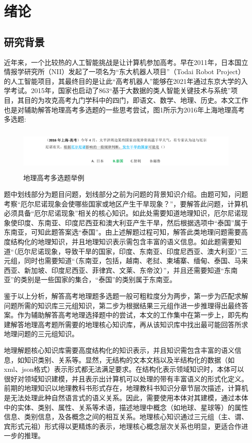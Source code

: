 \chapter{绪论}
\section{研究背景}
近年来，一个比较热的人工智能挑战是让计算机参加高考。早在2011年，日本国立情报学研究所（NII）发起了一项名为“东大机器人项目”（Todai Robot Project）的人工智能项目，其最终目的是让此“高考机器人”能够在2021年通过东京大学的入学考试\cite{Fujita}。2015年，国家也启动了863“基于大数据的类人智能关键技术与系统”项目，其目的为攻克高考九门学科中的四门，即语文、数学、地理、历史\cite{Cheng}。本文工作也是对辅助解答地理高考多选题的一些思考尝试，图1所示为2016年上海地理高考多选题:

\begin{figure}[!htb]
	\centering\includegraphics[height=2.2cm]{resource/ex_multi_choice_ques}
	\caption{地理高考多选题举例}
	\label{fig:ex_multi_choice_ques}
\end{figure}

题中划线部分为题目问题，划线部分之前为问题的背景知识介绍。由题可知，问题考察“厄尔尼诺现象会使哪些国家或地区产生干旱现象？”，要解答此问题，计算机必须具备“厄尔尼诺现象”相关的核心知识。如此处需要知道地理知识，厄尔尼诺现象使印度、东南亚、印度尼西亚和澳大利亚产生干旱，然后根据选项中“泰国”属于东南亚，可知此题答案选“泰国”。由上述解题过程可知，解答此类地理问题需要高度结构化的地理知识，并且地理知识表示需包含丰富的语义信息。如此题需要知道“（厄尔尼诺现象，导致干旱的国家，印度、东南亚、印度尼西亚、澳大利亚）”三元组，同时也需要知道“（东南亚，包括，越南、老挝、柬埔寨、缅甸、泰国、马来西亚、新加坡、印度尼西亚、菲律宾、文莱、东帝汶）”，并且还需要知道“东南亚”的类别是一些国家的集合，“泰国”的类别属于东南亚。

鉴于以上分析，解答高考地理题多选题一般可粗粒度分为两步，第一步为匹配求解问题所需的知识库三元组知识，第二步为根据结果三元组作进一步推理得出最终答案。作为辅助解答高考地理选择题中的尝试，本文的工作集中在第一步上，即先构建解答地理高考题所需要的地理核心知识库，再从该知识库中找出最可能回答所求地理问题的三元组知识。

地理解题核心知识库需要高度结构化的知识表示，并且知识需包含丰富的语义信息，如知识类别、关系等。显然，无结构的文本文档以及半结构化的数据（如xml、json格式）表示形式都无法满足要求。在结构化表示领域知识时，本体可以很好对领域知识建模，并且表示出计算机可以处理的带有丰富语义的形式化定义\cite{Hitzler}。前期的地理知识以地理教科书形式存在，地理教科书知识分章节层次描述，计算机是无法处理此种自然语言式的语义关系。因此，需要使用本体对其建模，通过本体中的实体、类别、属性、关系等术语，描述地理中概念（如地球、星球等）的属性信息、类别信息，及各概念之间的相互关系。地理核心知识通过三元组（主、谓、宾形式元祖）形式得以更精炼的表示，地理核心概念层次关系也明显，更适合作进一步的推理。

